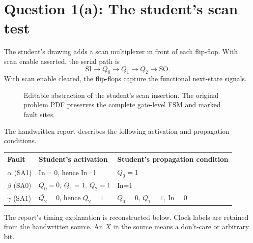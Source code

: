 \documentclass[11pt,a4paper]{article}
\begin{document}
\section{Question 1(a): The student's scan test}
The student's drawing adds a scan multiplexer in front of each flip-flop. With scan enable asserted, the serial path is
\[
\mathrm{SI}\longrightarrow Q_0\longrightarrow Q_1\longrightarrow Q_2
\longrightarrow\mathrm{SO}.
\]
With scan enable cleared, the flip-flops capture the functional next-state signals.
\begin{figure}[ht]\centering
{}
\caption{Editable abstraction of the student's scan insertion. The original problem PDF preserves the complete gate-level FSM and marked fault sites.}
\end{figure}
The handwritten report describes the following activation and propagation conditions.
\begin{center}\begin{tabular}{lll}
\toprule Fault & Student's activation & Student's propagation condition\\\midrule
$\alpha$ (SA1)&$\overline{\mathrm{In}}=0$, hence In=1&$Q_0=1$\\
$\beta$ (SA0)&$Q_0=0,\ Q_1=1,\ Q_2=1$&In=1\\
$\gamma$ (SA1)&$\overline{Q_2}=0$, hence $Q_2=1$&$Q_0=0,\ Q_1=1,\ \mathrm{In}=0$\\
\bottomrule\end{tabular}\end{center}
The report's timing explanation is reconstructed below. Clock labels are retained from the handwritten source. An $X$ in the source means a don't-care or arbitrary bit.
\end{document}
